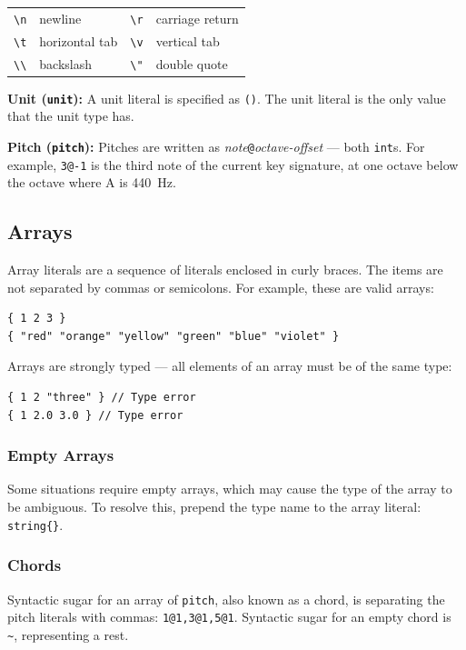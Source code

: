 \documentclass[11pt, onecolumn, letterpaper]{article}
\begin{document}
\begin{tabular}{ r l r l }
  \texttt{\textbackslash n} & newline & \texttt{\textbackslash r} & carriage return \\
  \texttt{\textbackslash t} & horizontal tab & \texttt{\textbackslash v} & vertical tab \\
  \texttt{\textbackslash \textbackslash} & backslash & \texttt{\textbackslash "} & double quote \\
\end{tabular}

\textbf{Unit (\texttt{unit}):} A unit literal is specified as \texttt{()}. The unit literal is the only value that the unit type has.

\textbf{Pitch (\texttt{pitch}):} Pitches are written as \textit{note}\texttt{@}\textit{octave-offset} --- both \texttt{int}s. For example, \texttt{3@-1} is the third note of the current key signature, at one octave below the octave where A is 440~Hz.

\subsection{Arrays}
Array literals are a sequence of literals enclosed in curly braces. The items are not separated by commas or semicolons. For example, these are valid arrays:

\begin{lstlisting}
{ 1 2 3 }
{ "red" "orange" "yellow" "green" "blue" "violet" }
\end{lstlisting}

Arrays are strongly typed --- all elements of an array must be of the same type:

\begin{lstlisting}
{ 1 2 "three" } // Type error
{ 1 2.0 3.0 } // Type error
\end{lstlisting}

\subsubsection{Empty Arrays}
Some situations require empty arrays, which may cause the type of the array to be ambiguous. To resolve this, prepend the type name to the array literal: \texttt{string\{\}}.

\subsubsection{Chords}
Syntactic sugar for an array of \texttt{pitch}, also known as a chord, is separating the pitch literals with commas: \texttt{1@1,3@1,5@1}. Syntactic sugar for an empty chord is \texttt{\textasciitilde}, representing a rest.
\end{document}

